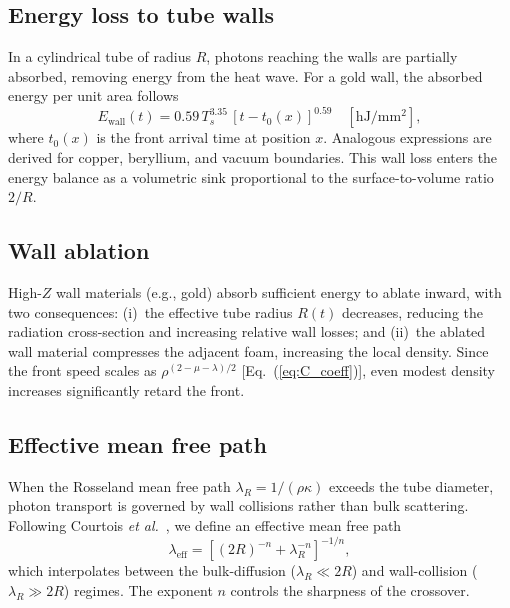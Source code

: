 \documentclass[prl, twocolumn, superscriptaddress, amsmath, amssymb, reprint]{revtex4-2}
\begin{document}
\subsection{Energy loss to tube walls}

In a cylindrical tube of radius $R$, photons reaching the walls are partially absorbed, removing energy from the heat wave.
For a gold wall, the absorbed energy per unit area follows
\begin{equation}\label{eq:wall_loss}
    E_{\mathrm{wall}}(t) = 0.59\,T_s^{3.35}\,[t - t_0(x)]^{0.59}\quad[\mathrm{hJ/mm^2}],
\end{equation}
where $t_0(x)$ is the front arrival time at position $x$.
Analogous expressions are derived for copper, beryllium, and vacuum boundaries.
This wall loss enters the energy balance as a volumetric sink proportional to the surface-to-volume ratio $2/R$.

\subsection{Wall ablation}

High-$Z$ wall materials (e.g., gold) absorb sufficient energy to ablate inward, with two consequences:
(i)~the effective tube radius $R(t)$ decreases, reducing the radiation cross-section and increasing relative wall losses; and
(ii)~the ablated wall material compresses the adjacent foam, increasing the local density.
Since the front speed scales as $\rho^{(2-\mu-\lambda)/2}$ [Eq.~(\ref{eq:C_coeff})], even modest density increases significantly retard the front.

\subsection{Effective mean free path}

When the Rosseland mean free path $\lambda_R = 1/(\rho\kappa)$ exceeds the tube diameter, photon transport is governed by wall collisions rather than bulk scattering.
Following Courtois \textit{et al.}~\cite{Courtois2024}, we define an effective mean free path
\begin{equation}\label{eq:lam_eff}
    \lambda_{\mathrm{eff}} = \left[(2R)^{-n} + \lambda_R^{-n}\right]^{-1/n},
\end{equation}
which interpolates between the bulk-diffusion ($\lambda_R \ll 2R$) and wall-collision ($\lambda_R \gg 2R$) regimes.
The exponent $n$ controls the sharpness of the crossover.
\end{document}
